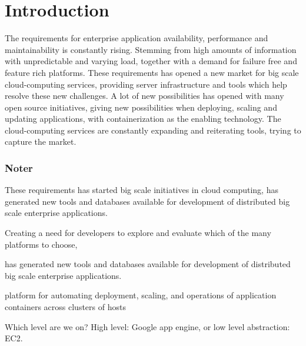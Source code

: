 \chapter{Introduction}
\label{ch:introduction}
The requirements for enterprise application availability, performance and maintainability is constantly rising. Stemming from high amounts of information with unpredictable and varying load, together with a demand for failure free and feature rich platforms. These requirements has opened a new market for big scale cloud-computing services, providing server infrastructure and tools which help resolve these new challenges. A lot of new possibilities has opened with many open source initiatives, giving new possibilities when deploying, scaling and updating applications, with containerization as the enabling technology. The cloud-computing services are constantly expanding and reiterating tools, trying to capture the market.





\subsection*{Noter}

These requirements has started big scale initiatives in cloud computing, has generated new tools and databases available for development of distributed big scale enterprise applications. 

Creating a need for developers to explore and evaluate which of the many platforms to choose, 

has generated new tools and databases available for development of distributed big scale enterprise applications.

platform for automating deployment, scaling, and operations of application containers across clusters of hosts


Which level are we on? High level: Google app engine, or low level abstraction: EC2.